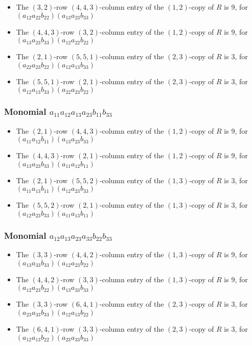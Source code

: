\documentclass{article}
\begin{document}
\begin{itemize}
\item The $(3, 2)$-row $(4, 4, 3)$-column entry of the $ \left(1, 2\right) $-copy of $R$ is $ 9 $, for $( a_{12} a_{22} b_{22} )( a_{13} a_{23} b_{33} )$ 
\item The $(4, 4, 3)$-row $(3, 2)$-column entry of the $ \left(1, 2\right) $-copy of $R$ is $ 9 $, for $( a_{13} a_{23} b_{33} )( a_{12} a_{22} b_{22} )$ 
\item The $(2, 1)$-row $(5, 5, 1)$-column entry of the $ \left(2, 3\right) $-copy of $R$ is $ 3 $, for $( a_{22} a_{23} b_{22} )( a_{12} a_{13} b_{33} )$ 
\item The $(5, 5, 1)$-row $(2, 1)$-column entry of the $ \left(2, 3\right) $-copy of $R$ is $ 3 $, for $( a_{12} a_{13} b_{33} )( a_{22} a_{23} b_{22} )$ 
\end{itemize}
\subsubsection{Monomial $ a_{11} a_{12} a_{13} a_{23} b_{11} b_{33} $}

\begin{itemize}
\item The $(2, 1)$-row $(4, 4, 3)$-column entry of the $ \left(1, 2\right) $-copy of $R$ is $ 9 $, for $( a_{11} a_{12} b_{11} )( a_{13} a_{23} b_{33} )$ 
\item The $(4, 4, 3)$-row $(2, 1)$-column entry of the $ \left(1, 2\right) $-copy of $R$ is $ 9 $, for $( a_{13} a_{23} b_{33} )( a_{11} a_{12} b_{11} )$ 
\item The $(2, 1)$-row $(5, 5, 2)$-column entry of the $ \left(1, 3\right) $-copy of $R$ is $ 3 $, for $( a_{11} a_{13} b_{11} )( a_{12} a_{23} b_{33} )$ 
\item The $(5, 5, 2)$-row $(2, 1)$-column entry of the $ \left(1, 3\right) $-copy of $R$ is $ 3 $, for $( a_{12} a_{23} b_{33} )( a_{11} a_{13} b_{11} )$ 
\end{itemize}
\subsubsection{Monomial $ a_{12} a_{13} a_{23} a_{33} b_{22} b_{33} $}

\begin{itemize}
\item The $(3, 3)$-row $(4, 4, 2)$-column entry of the $ \left(1, 3\right) $-copy of $R$ is $ 9 $, for $( a_{13} a_{33} b_{33} )( a_{12} a_{23} b_{22} )$ 
\item The $(4, 4, 2)$-row $(3, 3)$-column entry of the $ \left(1, 3\right) $-copy of $R$ is $ 9 $, for $( a_{12} a_{23} b_{22} )( a_{13} a_{33} b_{33} )$ 
\item The $(3, 3)$-row $(6, 4, 1)$-column entry of the $ \left(2, 3\right) $-copy of $R$ is $ 3 $, for $( a_{23} a_{33} b_{33} )( a_{12} a_{13} b_{22} )$ 
\item The $(6, 4, 1)$-row $(3, 3)$-column entry of the $ \left(2, 3\right) $-copy of $R$ is $ 3 $, for $( a_{12} a_{13} b_{22} )( a_{23} a_{33} b_{33} )$ 
\end{itemize}
\end{document}

